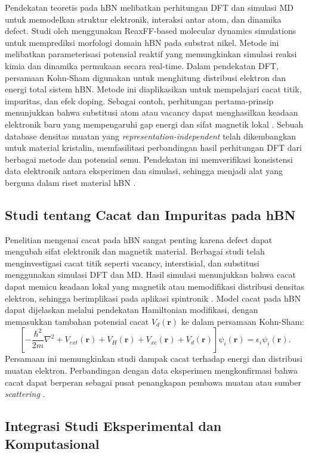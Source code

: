 Pendekatan teoretis pada hBN melibatkan perhitungan DFT dan simulasi MD untuk memodelkan struktur elektronik, interaksi antar atom, dan dinamika defect. Studi oleh \citep{Lele2022} menggunakan ReaxFF-based molecular dynamics simulations untuk memprediksi morfologi domain hBN pada substrat nikel. Metode ini melibatkan parameterisasi potensial reaktif yang memungkinkan simulasi reaksi kimia dan dinamika permukaan secara real-time. Dalam pendekatan DFT, persamaan Kohn-Sham digunakan untuk menghitung distribusi elektron dan energi total sistem hBN. Metode ini diaplikasikan untuk mempelajari cacat titik, impuritas, dan efek doping. Sebagai contoh, perhitungan pertama-prinsip menunjukkan bahwa substitusi atom atau vacancy dapat menghasilkan keadaan elektronik baru yang mempengaruhi gap energi dan sifat magnetik lokal \citep{Zhang2020}. Sebuah database densitas muatan yang \emph{representation-independent} telah dikembangkan untuk material kristalin, memfasilitasi perbandingan hasil perhitungan DFT dari berbagai metode dan potensial semu. Pendekatan ini memverifikasi konsistensi data elektronik antara eksperimen dan simulasi, sehingga menjadi alat yang berguna dalam riset material hBN \citep{Shen2022}. \subsection{Studi tentang Cacat dan Impuritas pada hBN}
Penelitian mengenai cacat pada hBN sangat penting karena defect dapat mengubah sifat elektronik dan magnetik material. Berbagai studi telah menginvestigasi cacat titik seperti vacancy, interstisial, dan substitusi menggunakan simulasi DFT dan MD. Hasil simulasi menunjukkan bahwa cacat dapat memicu keadaan lokal yang magnetik atau memodifikasi distribusi densitas elektron, sehingga berimplikasi pada aplikasi spintronik \citep{Zhang2020}. Model cacat pada hBN dapat dijelaskan melalui pendekatan Hamiltonian modifikasi, dengan memasukkan tambahan potensial cacat \(V_d(\mathbf{r})\) ke dalam persamaan Kohn-Sham:
\begin{equation}
    \left[-\frac{\hbar^2}{2m}\nabla^2 + V_{ext}(\mathbf{r}) + V_H(\mathbf{r}) + V_{xc}(\mathbf{r}) + V_d(\mathbf{r})\right]\psi_i(\mathbf{r}) = \epsilon_i \psi_i(\mathbf{r}).
 \end{equation}
Persamaan ini memungkinkan studi dampak cacat terhadap energi dan distribusi muatan elektron. Perbandingan dengan data eksperimen mengkonfirmasi bahwa cacat dapat berperan sebagai pusat penangkapan pembawa muatan atau sumber \emph{scattering} \citep{Zhang2020}. \subsection{Integrasi Studi Eksperimental dan Komputasional}
